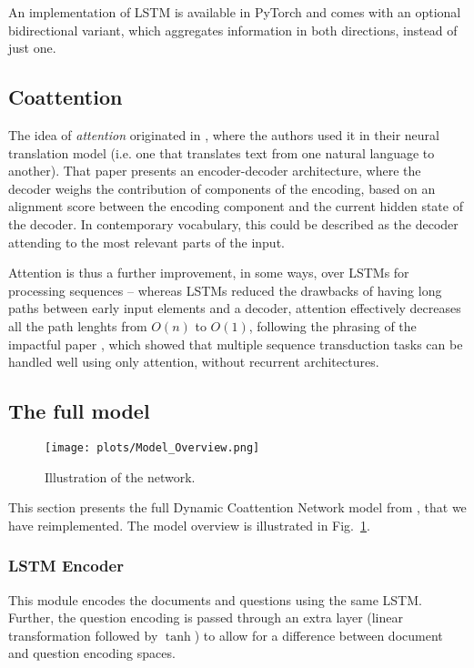 \documentclass[a4paper, 10pt, conference]{article}
\begin{document}
An implementation of LSTM is available in PyTorch and comes with an optional bidirectional variant, which aggregates information in both directions, instead of just one.

\subsection{Coattention}
The idea of \textit{attention} originated in \cite{attention-foundational-paper}, where the authors used it in their neural translation model (i.e. one that translates text from one natural language to another). That paper presents an encoder-decoder architecture, where the decoder weighs the contribution of components of the encoding, based on an alignment score between the encoding component and the current hidden state of the decoder. In contemporary vocabulary, this could be described as the decoder attending to the most relevant parts of the input.

Attention is thus a further improvement, in some ways, over LSTMs for processing sequences -- whereas LSTMs reduced the drawbacks of having long paths between early input elements and a decoder, attention effectively decreases all the path lenghts from $O(n)$ to $O(1)$, following the phrasing of the impactful paper \cite{attention-is-all-you-need}, which showed that multiple sequence transduction tasks can be handled well using only attention, without recurrent architectures.

\subsection{The full model}

\begin{figure}\label{fig:dcn}
\centering
\texttt{[image: plots/Model\_Overview.png]}
\caption{Illustration of the network.}
\end{figure}

This section presents the full Dynamic Coattention Network model from \cite{dcn}, that we have reimplemented. The model overview is illustrated in Fig.~\ref{fig:dcn}.

\subsubsection{LSTM Encoder}
This module encodes the documents and questions using the same LSTM. Further, the question encoding is passed through an extra layer (linear transformation followed by $\tanh$) to allow for a difference between document and question encoding spaces.
\end{document}
